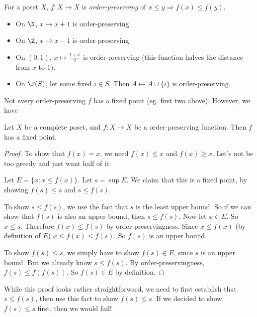 \documentclass[a4paper]{article}
\begin{document}
\begin{defi}
  For a poset $X$, $f: X\to X$ is \emph{order-preserving} of $x \leq y \Rightarrow f(x) \leq f(y)$.
\end{defi}

\begin{eg}\leavevmode
  \begin{itemize}
    \item On $\N$, $x\mapsto x + 1$ is order-preserving
    \item On $\Z$, $x\mapsto x - 1$ is order-preserving
    \item On $(0, 1)$, $x\mapsto \frac{1 + x}{2}$ is order-preserving (this function halves the distance from $x$ to $1$).
    \item On $\P(S)$, let some fixed $i\in S$. Then $A\mapsto A\cup \{i\}$ is order-preserving.
  \end{itemize}
\end{eg}
Not every order-preserving $f$ has a fixed point (eg. first two above). However, we have
\begin{thm}
  Let $X$ be a complete poset, and $f: X\to X$ be a order-preserving function. Then $f$ has a fixed point.
\end{thm}

\begin{proof}
  To show that $f(x) = x$, we need $f(x) \leq x$ and $f(x) \geq x$. Let's not be too greedy and just want half of it:

  Let $E = \{x: x \leq f(x)\}$. Let $s = \sup E$. We claim that this is a fixed point, by showing $f(s) \leq s$ and $s \leq f(s)$.

  To show $s \leq f(s)$, we use the fact that $s$ is the least upper bound. So if we can show that $f(s)$ is also an upper bound, then $s \leq f(s)$. Now let $x \in E$. So $x\leq s$. Therefore $f(x) \leq f(s)$ by order-preservingness. Since $x \leq f(x)$ (by definition of $E$) $x \leq f(x) \leq f(s)$. So $f(s)$ is an upper bound.

  To show $f(s) \leq s$, we simply have to show $f(s) \in E$, since $s$ is an upper bound. But we already know $s \leq f(s)$. By order-preservingness, $f(s) \leq f(f(s))$. So $f(s)\in E$ by definition.
\end{proof}
While this proof looks rather straightforward, we need to first establish that $s \leq f(s)$, then use this fact to show $f(s) \leq s$. If we decided to show $f(s) \leq s$ first, then we would fail!
\end{document}
